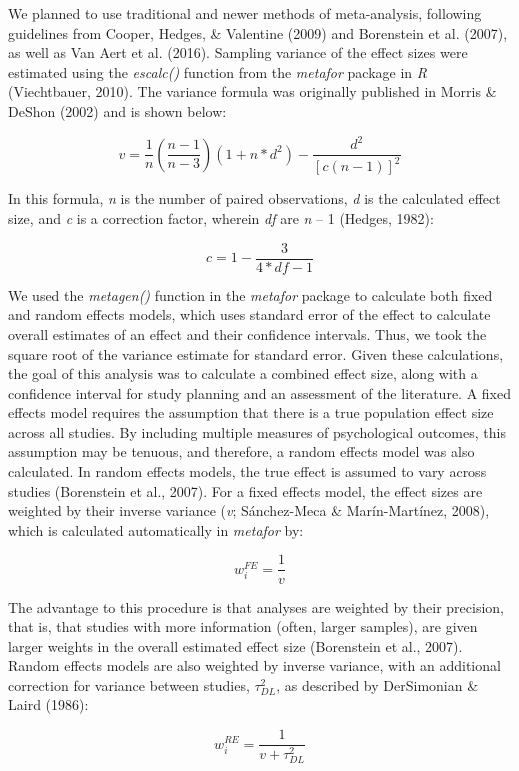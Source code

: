 \documentclass[man, mask]{apa6}
\theoremstyle{definition}
\theoremstyle{definition}
\theoremstyle{definition}
\theoremstyle{remark}
\begin{document}
We planned to use traditional and newer methods of meta-analysis,
following guidelines from Cooper, Hedges, \& Valentine (2009) and
Borenstein et al. (2007), as well as Van Aert et al. (2016). Sampling
variance of the effect sizes were estimated using the \emph{escalc()}
function from the \emph{metafor} package in \emph{R} (Viechtbauer,
2010). The variance formula was originally published in Morris \& DeShon
(2002) and is shown below:

\[
v = \frac { 1 } { n } (\frac { n - 1 } { n - 3 } )(1 + n*d^2) - \frac { d^2 } { [c(n-1)]^2}
\]

In this formula, \emph{n} is the number of paired observations, \emph{d}
is the calculated effect size, and \emph{c} is a correction factor,
wherein \emph{df} are \emph{n} -- 1 (Hedges, 1982):

\[
c = 1 - \frac { 3 } { 4*df - 1 }
\]

We used the \emph{metagen()} function in the \emph{metafor} package to
calculate both fixed and random effects models, which uses standard
error of the effect to calculate overall estimates of an effect and
their confidence intervals. Thus, we took the square root of the
variance estimate for standard error. Given these calculations, the goal
of this analysis was to calculate a combined effect size, along with a
confidence interval for study planning and an assessment of the
literature. A fixed effects model requires the assumption that there is
a true population effect size across all studies. By including multiple
measures of psychological outcomes, this assumption may be tenuous, and
therefore, a random effects model was also calculated. In random effects
models, the true effect is assumed to vary across studies (Borenstein et
al., 2007). For a fixed effects model, the effect sizes are weighted by
their inverse variance (\emph{v}; Sánchez-Meca \& Marín-Martínez, 2008),
which is calculated automatically in \emph{metafor} by:

\[
w_{i}^{FE} = \frac {1} {v}
\]

The advantage to this procedure is that analyses are weighted by their
precision, that is, that studies with more information (often, larger
samples), are given larger weights in the overall estimated effect size
(Borenstein et al., 2007). Random effects models are also weighted by
inverse variance, with an additional correction for variance between
studies, \(\tau^2_{DL}\), as described by DerSimonian \& Laird (1986):

\[
w_{i}^{RE} = \frac {1} {v + \tau^2_{DL}}
\]
\end{document}
